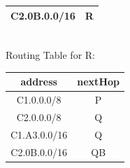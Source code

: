 \documentclass[a4paper]{article}
\begin{document}
\begin{itemize}
\begin{tabular}{|c|c|}
	      	C2.0B.0.0/16  & R       \\
	      	\hline
	      \end{tabular} \\
	      Routing Table for R: \\
	      \begin{tabular}{|c|c|}
	      	\hline
	      	address      & nextHop \\
	      	\hline	
	      	C1.0.0.0/8   & P       \\
	      	\hline	
	      	C2.0.0.0/8   & Q       \\
	      	\hline
	      	C1.A3.0.0/16 & Q       \\
	      	\hline
	      	C2.0B.0.0/16 & QB      \\
	      	\hline
	      \end{tabular}
\end{itemize}
\end{document}
